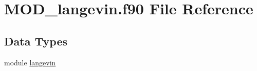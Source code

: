 \hypertarget{MOD__langevin_8f90}{\section{M\-O\-D\-\_\-langevin.\-f90 File Reference}
\label{MOD__langevin_8f90}
}
\subsection*{Data Types}
\begin{DoxyCompactItemize}
\item 
module \hyperlink{classlangevin}{langevin}
\end{DoxyCompactItemize}
